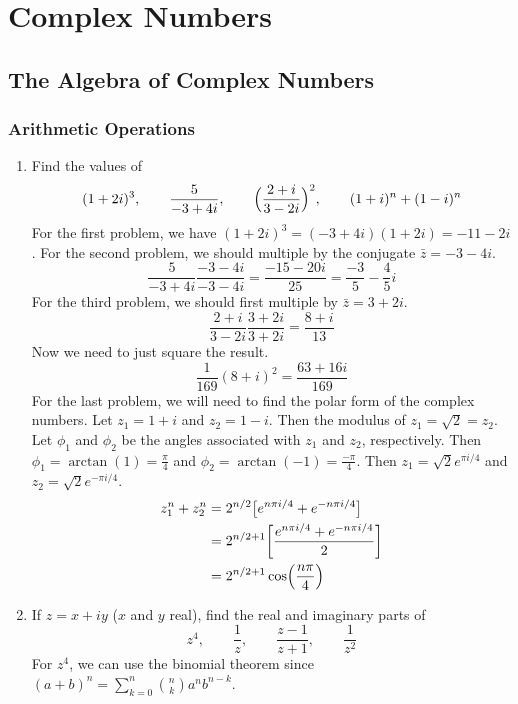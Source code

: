 \chapter{Complex Numbers}

\section{The Algebra of Complex Numbers}

\subsection{Arithmetic Operations}

\begin{enumerate}
\item
  Find the values of
  \[
  (1 + 2i)^3, \qquad \frac{5}{-3 + 4i}, \qquad
  \Bigl(\frac{2 + i}{3 - 2i}\Bigr)^2, \qquad (1 + i)^n + (1 - i)^n
  \]
  For the first problem, we have \((1 + 2i)^3 = (-3 + 4i)(1 + 2i) = -11 - 2i\).
  For the second problem, we should multiple by the conjugate
  \(\bar{z} = -3 - 4i\).
  \[
  \frac{5}{-3 + 4i}\frac{-3 - 4i}{-3 - 4i} = \frac{-15 - 20i}{25} =
  \frac{-3}{5} - \frac{4}{5}i
  \]
  For the third problem, we should first multiple by \(\bar{z} = 3 + 2i\).
  \[
  \frac{2 + i}{3 - 2i}\frac{3 + 2i}{3 + 2i} = \frac{8 + i}{13}
  \]
  Now we need to just square the result.
  \[
  \frac{1}{169}(8 + i)^2 = \frac{63 + 16i}{169}
  \]
  For the last problem, we will need to find the polar form of the complex
  numbers.
  Let \(z_1 = 1 + i\) and \(z_2 = 1 - i\).
  Then the modulus of \(z_1 = \sqrt{2} = z_2\).
  Let \(\phi_1\) and \(\phi_2\) be the angles associated with \(z_1\) and
  \(z_2\), respectively.
  Then \(\phi_1 = \arctan(1) = \frac{\pi}{4}\) and
  \(\phi_2 = \arctan(-1) = \frac{-\pi}{4}\).
  Then \(z_1 = \sqrt{2}e^{\pi i/4}\) and \(z_2 = \sqrt{2}e^{-\pi i/4}\).
  \begin{align*}
    z_1^n + z_2^n
    & = 2^{n/2}\bigl[e^{n\pi i/4} + e^{-n\pi i/4}\bigr]\\
    & = 2^{n/2 + 1}\biggl[\frac{e^{n\pi i/4} + e^{-n\pi i/4}}{2}\biggr]\\
    & = 2^{n/2 + 1}\cos\Bigl(\frac{n\pi}{4}\Bigr)
  \end{align*}
\item
  If \(z = x + iy\) (\(x\) and \(y\) real), find the real and imaginary parts
  of
  \[
  z^4, \qquad \frac{1}{z}, \qquad \frac{z - 1}{z + 1}, \qquad \frac{1}{z^2}
  \]
  For \(z^4\), we can use the binomial theorem since
  \((a + b)^n = \sum_{k = 0}^n\binom{n}{k}a^nb^{n - k}\).

\end{enumerate}
